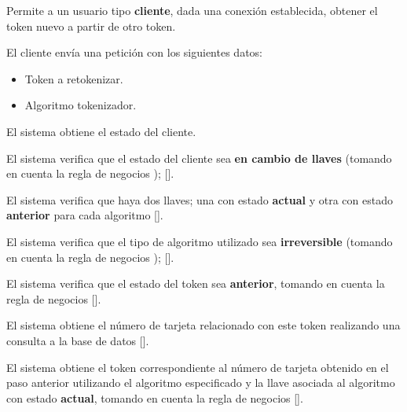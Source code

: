 %
%

{
  Permite a un usuario tipo \textbf{cliente}, dada una conexión establecida, obtener el
  token nuevo a partir de otro token.

  \begin{trayectoriaPrincipal}

    \item El cliente envía una petición con los siguientes datos:
      \begin{itemize}
        \item Token a retokenizar.
        \item Algoritmo tokenizador.
      \end{itemize}

    \item El sistema obtiene el estado del cliente.

    \item El sistema verifica que el estado del cliente sea
      \textbf{en cambio de llaves} (tomando en cuenta la regla de negocios
      );
      [].

    \item El sistema verifica que haya dos llaves; una con estado
      \textbf{actual} y otra con estado \textbf{anterior} para cada algoritmo
      [].

    \item El sistema verifica que el tipo de algoritmo utilizado sea
      \textbf{irreversible} (tomando en cuenta la regla de negocios
      );
      [].

    \item El sistema verifica que el estado del token sea \textbf{anterior},
      tomando en cuenta la regla de negocios 
      [].

    \item El sistema obtiene el número de tarjeta relacionado con este token
      realizando una consulta a la base de datos
      [].

    \item El sistema obtiene el token correspondiente al número de tarjeta
      obtenido en el paso anterior utilizando el algoritmo especificado y la
      llave asociada al algoritmo con estado \textbf{actual}, tomando en cuenta
      la regla de negocios 
      [].


\end{trayectoriaPrincipal}}
